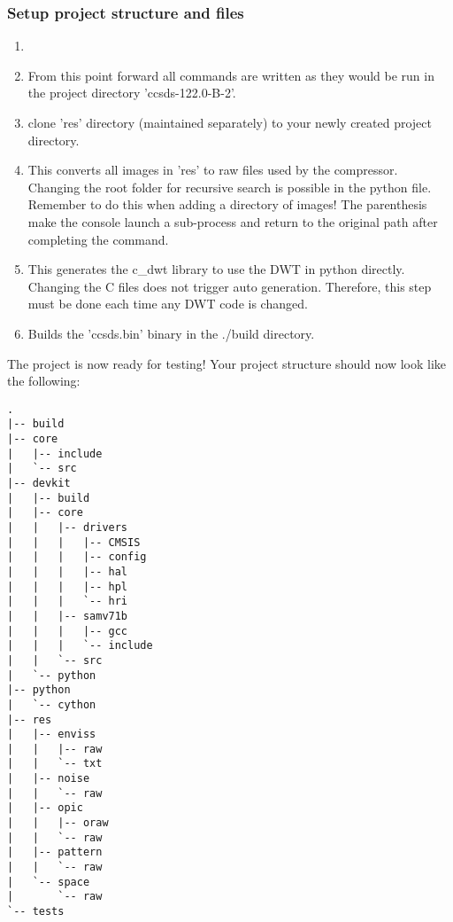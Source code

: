 \documentclass[12pt, a4paper]{article}
\begin{document}
\subsubsection{Setup project structure and files}
\begin{enumerate}

    \item {}

    \item {}

        \medskip
        From this point forward all commands are written as they would be 
        run in the project directory 'ccsds-122.0-B-2'.

    \medskip
    \item clone 'res' directory (maintained separately) to your newly created project directory.

    \medskip
    \item {}

        \medskip
        This converts all images in 'res' to raw files used by the compressor. 
        Changing the root folder for recursive search is possible in the python file. 
        Remember to do this when adding a directory of images! 
        The parenthesis make the console launch a sub-process and return to the original path after completing the command.

    \item {}

        \medskip
        This generates the c\_dwt library to use the DWT in python directly. 
        Changing the C files does not trigger auto generation. 
        Therefore, this step must be done each time any DWT code is changed.

    \item {}

        \medskip
        Builds the 'ccsds.bin' binary in the ./build directory.

\end{enumerate}

\noindent
The project is now ready for testing! 
Your project structure should now look like the following:

\medskip
\begin{minipage}{\linewidth}
\footnotesize
\begin{verbatim}
.
|-- build
|-- core
|   |-- include
|   `-- src
|-- devkit
|   |-- build
|   |-- core
|   |   |-- drivers
|   |   |   |-- CMSIS
|   |   |   |-- config
|   |   |   |-- hal
|   |   |   |-- hpl
|   |   |   `-- hri
|   |   |-- samv71b
|   |   |   |-- gcc
|   |   |   `-- include
|   |   `-- src
|   `-- python
|-- python
|   `-- cython
|-- res
|   |-- enviss
|   |   |-- raw
|   |   `-- txt
|   |-- noise
|   |   `-- raw
|   |-- opic
|   |   |-- oraw
|   |   `-- raw
|   |-- pattern
|   |   `-- raw
|   `-- space
|       `-- raw
`-- tests
\end{verbatim}
\end{minipage}
\end{document}
